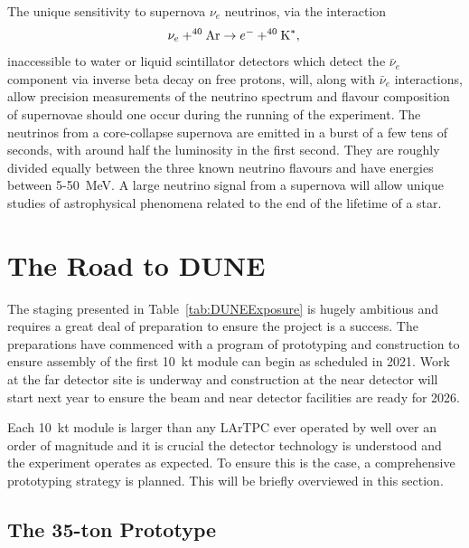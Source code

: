 The unique sensitivity to supernova $\nu_e$ neutrinos, via the interaction
\begin{equation}
  \nu_e + ^{40}\textnormal{Ar} \rightarrow e^- + ^{40}\textnormal{K}^*, \\
\end{equation}
inaccessible to water or liquid scintillator detectors which detect the $\bar{\nu}_e$ component via inverse beta decay on free protons, will, along with $\bar{\nu}_e$ interactions, allow precision measurements of the neutrino spectrum and flavour composition of supernovae should one occur during the running of the experiment.  The neutrinos from a core-collapse supernova are emitted in a burst of a few tens of seconds, with around half the luminosity in the first second.  They are roughly divided equally between the three known neutrino flavours and have energies between 5-50~MeV.  A large neutrino signal from a supernova will allow unique studies of astrophysical phenomena related to the end of the lifetime of a star.

\section{The Road to DUNE}\label{sec:RoadToDUNE}

The staging presented in Table~\ref{tab:DUNEExposure} is hugely ambitious and requires a great deal of preparation to ensure the project is a success.  The preparations have commenced with a program of prototyping and construction to ensure assembly of the first 10~kt module can begin as scheduled in 2021.  Work at the far detector site is underway and construction at the near detector will start next year to ensure the beam and near detector facilities are ready for 2026.

Each 10~kt module is larger than any LArTPC ever operated by well over an order of magnitude and it is crucial the detector technology is understood and the experiment operates as expected.  To ensure this is the case, a comprehensive prototyping strategy is planned.  This will be briefly overviewed in this section.

\subsection{The 35-ton Prototype}\label{sec:35ton}

